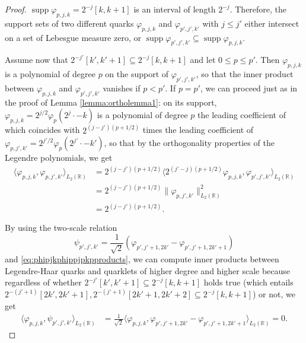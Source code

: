 \documentclass{article}
\DeclareMathOperator{\supp}{supp}
\begin{document}
\begin{proof}
$\supp\varphi_{p,j,k}=2^{-j}[k,k+1]$ is an interval of length $2^{-j}$. Therefore, the support sets of two different quarks $\varphi_{p,j,k}$ and $\varphi_{p',j',k'}$ with $j\le j'$ either intersect on a set of Lebesgue measure zero, or $\supp\varphi_{p',j',k'}\subseteq\supp\varphi_{p,j,k}$.

Assume now that $2^{-j'}[k',k'+1]\subseteq 2^{-j}[k,k+1]$ and let $0\le p\le p'$. Then $\varphi_{p,j,k}$ is a polynomial of degree $p$ on the support of $\varphi_{p',j',k'}$, so that the inner product between $\varphi_{p,j,k}$ and $\varphi_{p',j',k'}$ vanishes if $p<p'$. If $p=p'$, we can proceed just as in the proof of Lemma \ref{lemma:ortholemma1}: on its support, $\varphi_{p,j,k}=2^{j/2}\varphi_p(2^j\cdot -k)$ is a polynomial of degree $p$ the leading coefficient of which coincides with $2^{(j-j')(p+1/2)}$ times the leading coefficient of $\varphi_{p,j',k'}=2^{j'/2}\varphi_p(2^{j'}\cdot-k')$, so that by the orthogonality properties of the Legendre polynomials, we get
\begin{align*}
\langle\varphi_{p,j,k},\varphi_{p,j',k'}\rangle_{L_2(\mathbb R)}
&=
2^{(j-j')(p+1/2)}\langle 2^{(j'-j)(p+1/2)}\varphi_{p,j,k},\varphi_{p',j',k'}\rangle_{L_2(\mathds R)}\\
&=
2^{(j-j')(p+1/2)}\|\varphi_{p,j',k'}\|_{L_2(\mathbb R)}^2\\
&=
2^{(j-j')(p+1/2)}.
\end{align*}

By using the two-scale relation
\begin{equation*}
\psi_{p',j',k'}=\frac{1}{\sqrt{2}}(\varphi_{p',j'+1,2k'}-\varphi_{p',j'+1,2k'+1})
\end{equation*}
and \eqref{eq:phipjkphippjpkpproducts}, we can compute inner products between Legendre-Haar quarks and quarklets of higher degree and higher scale because regardless of whether $2^{-j'}[k',k'+1]\subseteq 2^{-j}[k,k+1]$ holds true (which entails $2^{-(j'+1)}[2k',2k'+1],2^{-(j'+1)}[2k'+1,2k'+2]\subseteq 2^{-j}[k,k+1]$) or not, we get
\begin{align*}
\langle \varphi_{p,j,k},\psi_{p',j',k'}\rangle_{L_2(\mathbb R)}
&=
\frac{1}{\sqrt{2}}
\langle\varphi_{p,j,k},\varphi_{p',j'+1,2k'}-\varphi_{p',j'+1,2k'+1}\rangle_{L_2(\mathbb R)}
=
0.
\end{align*}
\end{proof}
\end{document}
